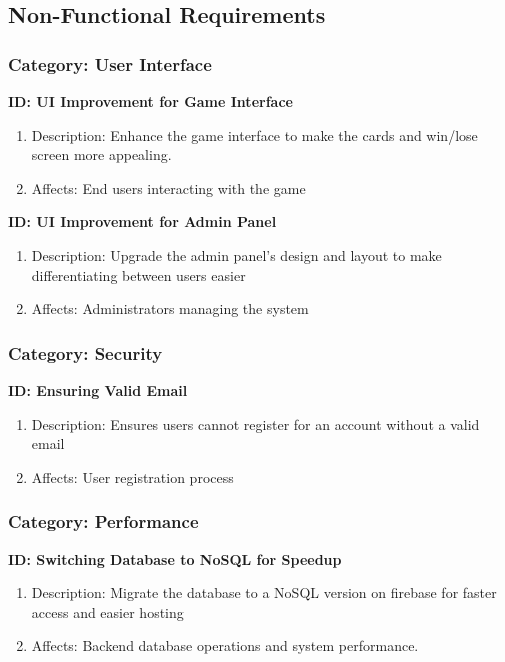 \subsection{Non-Functional Requirements}

\subsubsection{Category: User Interface}

\textbf{ID: UI Improvement for Game Interface}
\begin{enumerate}
\item Description: Enhance the game interface to make the cards and win/lose screen more appealing.
\item Affects: End users interacting with the game
\end{enumerate}


\textbf{ID: UI Improvement for Admin Panel}
\begin{enumerate}
\item Description: Upgrade the admin panel's design and layout to make differentiating between users easier
\item Affects: Administrators managing the system
\end{enumerate}


\subsubsection{Category: Security}

\textbf{ID: Ensuring Valid Email}
\begin{enumerate}
\item Description: Ensures users cannot register for an account without a valid email
\item Affects: User registration process
\end{enumerate}


\subsubsection{Category: Performance}

\textbf{ID: Switching Database to NoSQL for Speedup}
\begin{enumerate}
\item Description: Migrate the database to a NoSQL version on firebase for faster access and easier hosting
\item Affects: Backend database operations and system performance.
\end{enumerate}

